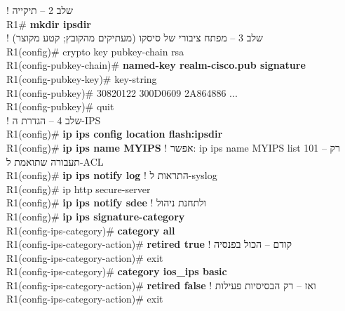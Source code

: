 \documentclass[11pt]{article}
\newcommand{\enLR}[1]{\textenglish{#1}}
\begin{document}
\begin{codebox}\begin{english}\codefont\footnotesize\color{cfg}\setlength{\parindent}{0pt}
\textcolor{ccom}{\texthebrew{! שלב \enLR{2} – תיקייה}}\\
R1\# \textcolor{cbold}{\textbf{mkdir ipsdir}}\\
\textcolor{ccom}{\texthebrew{! שלב \enLR{3} – מפתח ציבורי של סיסקו (מעתיקים מהקובץ; קטע מקוצר)}}\\
R1(config)\# crypto key pubkey-chain rsa\\
R1(config-pubkey-chain)\# \textcolor{cbold}{\textbf{named-key realm-cisco.pub signature}}\\
R1(config-pubkey-key)\# key-string\\
R1(config-pubkey)\# 30820122 300D0609 2A864886 ...\\
R1(config-pubkey)\# quit\\
\textcolor{ccom}{\texthebrew{! שלב \enLR{4} – הגדרת ה-\enLR{IPS}}}\\
R1(config)\# \textcolor{cbold}{\textbf{ip ips config location flash:ipsdir}}\\
R1(config)\# \textcolor{cbold}{\textbf{ip ips name MYIPS}}            \textcolor{ccom}{\texthebrew{! אפשר: \enLR{ip ips name MYIPS list 101} – רק תעבורה שתואמת ל-\enLR{ACL}}}\\
R1(config)\# \textcolor{cbold}{\textbf{ip ips notify log}}            \textcolor{ccom}{\texthebrew{! התראות ל-\enLR{syslog}}}\\
R1(config)\# ip http secure-server\\
R1(config)\# \textcolor{cbold}{\textbf{ip ips notify sdee}}           \textcolor{ccom}{\texthebrew{! ולתחנת ניהול}}\\
R1(config)\# \textcolor{cbold}{\textbf{ip ips signature-category}}\\
R1(config-ips-category)\# \textcolor{cbold}{\textbf{category all}}\\
R1(config-ips-category-action)\# \textcolor{cbold}{\textbf{retired true}}          \textcolor{ccom}{\texthebrew{! קודם – הכול בפנסיה}}\\
R1(config-ips-category-action)\# exit\\
R1(config-ips-category)\# \textcolor{cbold}{\textbf{category ios\_ips basic}}\\
R1(config-ips-category-action)\# \textcolor{cbold}{\textbf{retired false}}         \textcolor{ccom}{\texthebrew{! ואז – רק הבסיסיות פעילות}}\\
R1(config-ips-category-action)\# exit\\

\end{english}
\end{codebox}
\end{document}
